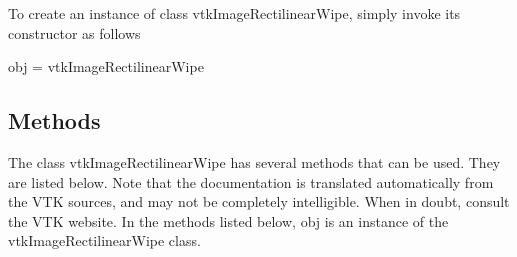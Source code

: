 To create an instance of class vtk\-Image\-Rectilinear\-Wipe, simply invoke its constructor as follows \begin{DoxyVerb}  obj = vtkImageRectilinearWipe
\end{DoxyVerb}
 \hypertarget{vtkwidgets_vtkxyplotwidget_Methods}{}\subsection{Methods}\label{vtkwidgets_vtkxyplotwidget_Methods}
The class vtk\-Image\-Rectilinear\-Wipe has several methods that can be used. They are listed below. Note that the documentation is translated automatically from the V\-T\-K sources, and may not be completely intelligible. When in doubt, consult the V\-T\-K website. In the methods listed below, {\ttfamily obj} is an instance of the vtk\-Image\-Rectilinear\-Wipe class. 
